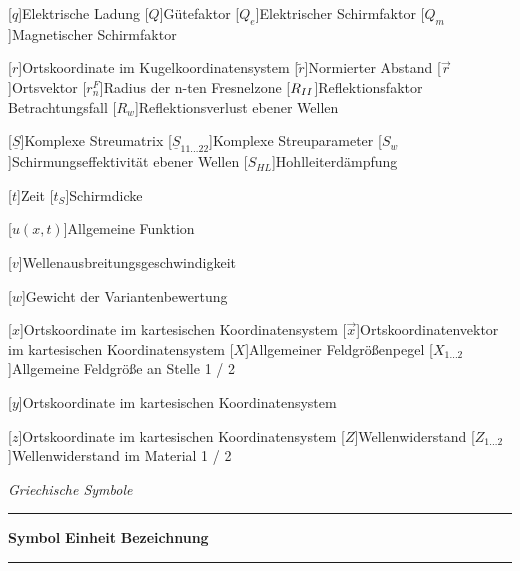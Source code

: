 \begin{acronym}[Platzhalterwort]
[$q$]{\acrounit{\ampere\second}Elektrische Ladung}
[$Q$]{\acrounit{-}Gütefaktor}
[$Q_e$]{\acrounit{-}Elektrischer Schirmfaktor}
[$Q_m$]{\acrounit{-}Magnetischer Schirmfaktor}

[$r$]{\acrounit{-}Ortskoordinate im Kugelkoordinatensystem}
[$\tilde r$]{Normierter Abstand}
[$\vec r$]{Ortsvektor}
[$r^F_n$]{\acrounit{\meter}Radius der n-ten Fresnelzone}
[$R_{\uproman{2}}$]{Reflektionsfaktor Betrachtungsfall }
[$R_w$]{\acrounit{\Dezibel}Reflektionsverlust ebener Wellen}

[$\underline{S}$]{\acrounit{-}Komplexe Streumatrix}
[$\underline{S}_{11\ldots22}$]{\acrounit{-}Komplexe Streuparameter}
[$S_w$]{\acrounit{\Dezibel}Schirmungseffektivität ebener Wellen}
[$S_{HL}$]{\acrounit{\Dezibel}Hohlleiterdämpfung}

[$t$]{\acrounit{\second}Zeit}
[$t_S$]{\acrounit{\meter}Schirmdicke}

[$u(x,t)$]{\acrounit{-}Allgemeine Funktion}

[$v$]{\acrounit{\meter\per\second}Wellenausbreitungsgeschwindigkeit}

[$w$]{\acrounit{-}Gewicht der Variantenbewertung}

[$x$]{\acrounit{-}Ortskoordinate im kartesischen Koordinatensystem}
[$\vec x$]{\acrounit{-}Ortskoordinatenvektor im kartesischen Koordinatensystem}
[$X$]{\acrounit{\Dezibel}Allgemeiner Feldgrößenpegel}
[$X_{1\ldots2}$]{\acrounit{-}Allgemeine Feldgröße an Stelle 1 / 2}

[$y$]{\acrounit{-}Ortskoordinate im kartesischen Koordinatensystem}

[$z$]{\acrounit{-}Ortskoordinate im kartesischen Koordinatensystem}
[$Z$]{\acrounit{-}Wellenwiderstand}
[$Z_{1\ldots2}$]{\acrounit{-}Wellenwiderstand im Material 1 / 2}

\end{acronym}
\newpage



\textit{Griechische Symbole} \\[.5\linespace]
\noindent\rule{\textwidth}{0.5pt}
\textbf{Symbol} \hspace{12.5mm} \textbf{Einheit} \hspace{10.5mm} \textbf{Bezeichnung} \\[-\linespace]
\noindent\rule{\textwidth}{0.5pt}

